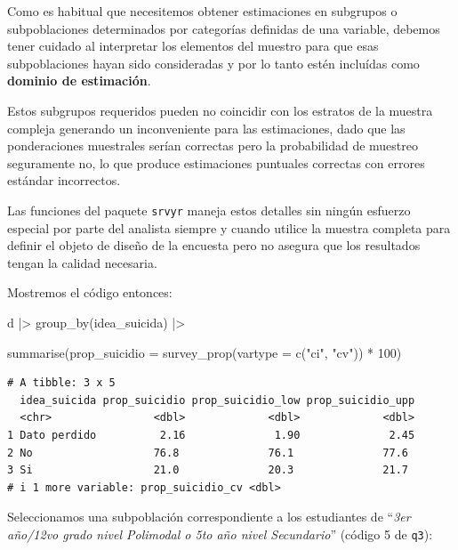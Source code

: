 \documentclass[
  spanish,
  a4paper,
]{scrbook}
\newenvironment{Shaded}{\begin{snugshade}}{\end{snugshade}}
\newcommand{\AttributeTok}[1]{\textcolor[rgb]{0.40,0.45,0.13}{#1}}
\newcommand{\DecValTok}[1]{\textcolor[rgb]{0.68,0.00,0.00}{#1}}
\newcommand{\FunctionTok}[1]{\textcolor[rgb]{0.28,0.35,0.67}{#1}}
\newcommand{\NormalTok}[1]{\textcolor[rgb]{0.00,0.23,0.31}{#1}}
\newcommand{\SpecialCharTok}[1]{\textcolor[rgb]{0.37,0.37,0.37}{#1}}
\newcommand{\StringTok}[1]{\textcolor[rgb]{0.13,0.47,0.30}{#1}}
\begin{document}
Como es habitual que necesitemos obtener estimaciones en subgrupos o
subpoblaciones determinados por categorías definidas de una variable,
debemos tener cuidado al interpretar los elementos del muestro para que
esas subpoblaciones hayan sido consideradas y por lo tanto estén
incluídas como \textbf{dominio de estimación}.

Estos subgrupos requeridos pueden no coincidir con los estratos de la
muestra compleja generando un inconveniente para las estimaciones, dado
que las ponderaciones muestrales serían correctas pero la probabilidad
de muestreo seguramente no, lo que produce estimaciones puntuales
correctas con errores estándar incorrectos.

Las funciones del paquete \texttt{srvyr} maneja estos detalles sin
ningún esfuerzo especial por parte del analista siempre y cuando utilice
la muestra completa para definir el objeto de diseño de la encuesta pero
no asegura que los resultados tengan la calidad necesaria.

Mostremos el código entonces:

\begin{Shaded}
\begin{Highlighting}[]
\NormalTok{d }\SpecialCharTok{|\textgreater{}}
  \FunctionTok{group\_by}\NormalTok{(idea\_suicida) }\SpecialCharTok{|\textgreater{}}

  \FunctionTok{summarise}\NormalTok{(}\AttributeTok{prop\_suicidio =} \FunctionTok{survey\_prop}\NormalTok{(}\AttributeTok{vartype =} \FunctionTok{c}\NormalTok{(}\StringTok{"ci"}\NormalTok{, }\StringTok{"cv"}\NormalTok{)) }\SpecialCharTok{*} \DecValTok{100}\NormalTok{)}
\end{Highlighting}
\end{Shaded}

\begin{verbatim}
# A tibble: 3 x 5
  idea_suicida prop_suicidio prop_suicidio_low prop_suicidio_upp
  <chr>                <dbl>             <dbl>             <dbl>
1 Dato perdido          2.16              1.90              2.45
2 No                   76.8              76.1              77.6 
3 Si                   21.0              20.3              21.7 
# i 1 more variable: prop_suicidio_cv <dbl>
\end{verbatim}

Seleccionamos una subpoblación correspondiente a los estudiantes de
``\emph{3er año/12vo grado nivel Polimodal o 5to año nivel Secundario}''
(código 5 de \texttt{q3}):
\end{document}
